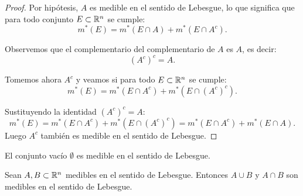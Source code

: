 \begin{proof}
    Por hipótesis, $A$ es medible en el sentido de Lebesgue, lo que significa que para todo conjunto $E \subset \mathbb{R}^n$ se cumple:
    \[
        m^*(E) = m^*(E \cap A) + m^*(E \cap A^c).
    \]
    
    Observemos que el complementario del complementario de $A$ es $A$, es decir:
    \[
        (A^c)^c = A.
    \]
    
    Tomemos ahora $A^c$ y veamos si para todo $E \subset \mathbb{R}^n$ se cumple:
    \[
        m^*(E) = m^*(E \cap A^c) + m^*(E \cap (A^c)^c).
    \]
    
    Sustituyendo la identidad $(A^c)^c = A$:
    \[
        m^*(E) = m^*(E \cap A^c) + m^*(E \cap (A^c)^c) = m^*(E \cap A^c) + m^*(E \cap A).
    \]
    Luego $A^c$ también es medible en el sentido de Lebesgue. 
\end{proof}

\begin{corolario}
    El conjunto vacío $\emptyset$ es medible en el sentido de Lebesgue.
    \label{corolarioVacioMedible}
\end{corolario}

\begin{lema}\label{unionMedible}
    Sean $A, B \subset \mathbb{R}^n$ medibles en el sentido de Lebesgue. Entonces $A \cup B$ y $A \cap B$ son medibles en el sentido de Lebesgue.
\end{lema}

